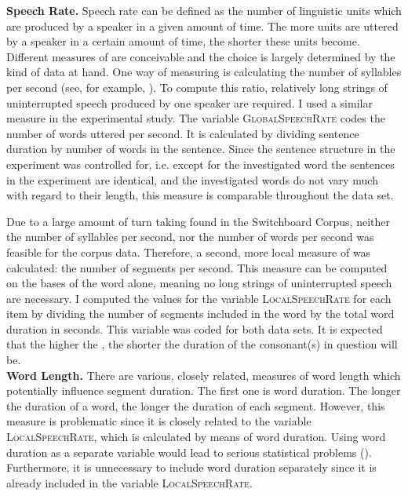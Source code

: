 \textbf{Speech Rate.} Speech rate can be defined as the number of linguistic units which are produced by a speaker in a given amount of time. The more units are uttered by a speaker in a certain amount of time, the shorter these units become. Different measures of  are conceivable and the choice is largely determined by the kind of data at hand. One way of measuring  is calculating the number of syllables per second (see, for example, \citealt{Pluymaekers.2005, Plag.2017}). To compute this ratio, relatively long strings of uninterrupted speech produced by one speaker are required.  I used a similar measure in the experimental study. The variable \textsc{GlobalSpeechRate} codes the number of words uttered per second. It is calculated by dividing sentence duration by number of words in the sentence. Since the sentence structure in the experiment was controlled for, i.e. except for the investigated word the sentences in the experiment are identical, and the investigated words do not vary much with regard to their length, this measure is comparable throughout the data set. 

Due to a large amount of turn taking found in the Switchboard Corpus, neither the number of syllables per second, nor the number of words per second was feasible for the corpus data. Therefore, a second, more local measure of  was calculated: the number of segments per second. This measure can be computed on the bases of the word alone, meaning no long strings of uninterrupted speech are necessary.
I computed the values for the variable \textsc{LocalSpeechRate} for each item by dividing the number of segments included in the word by the total word duration in seconds.  This variable was coded for both data sets.
 It is expected that the higher the , the shorter the duration of the consonant(s) in question will be.\\





\textbf{Word Length.} There are various, closely related, measures of word length which potentially influence segment duration. The first one is word duration. The longer the duration of a word, the longer the duration of each segment. However, this measure is problematic since it is closely related to the variable \textsc{LocalSpeechRate}, which is calculated by means of word duration. Using word duration as a separate variable would lead to serious statistical problems (). Furthermore, it is unnecessary to include word duration separately since it is already included in the variable \textsc{LocalSpeechRate}.

